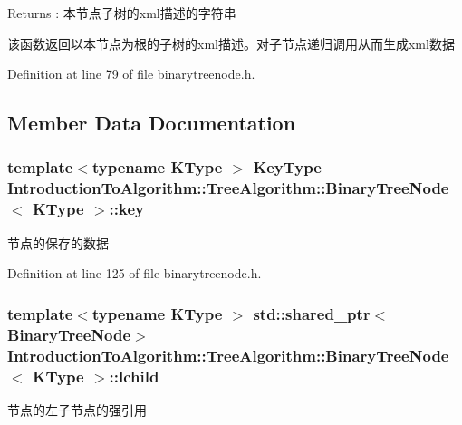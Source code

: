 \begin{DoxyReturn}{Returns}
\+: 本节点子树的{\ttfamily xml}描述的字符串
\end{DoxyReturn}
该函数返回以本节点为根的子树的{\ttfamily xml}描述。对子节点递归调用从而生成{\ttfamily xml}数据 

Definition at line 79 of file binarytreenode.\+h.



\subsection{Member Data Documentation}
\hypertarget{struct_introduction_to_algorithm_1_1_tree_algorithm_1_1_binary_tree_node_af3cb8030ab05ccaf1a69a86c9f468b8d}{}
\subsubsection[{key}]{\setlength{\rightskip}{0pt plus 5cm}template$<$typename K\+Type $>$ {\bf Key\+Type} {\bf Introduction\+To\+Algorithm\+::\+Tree\+Algorithm\+::\+Binary\+Tree\+Node}$<$ K\+Type $>$\+::key}\label{struct_introduction_to_algorithm_1_1_tree_algorithm_1_1_binary_tree_node_af3cb8030ab05ccaf1a69a86c9f468b8d}
节点的保存的数据 

Definition at line 125 of file binarytreenode.\+h.

\hypertarget{struct_introduction_to_algorithm_1_1_tree_algorithm_1_1_binary_tree_node_a3e056b1d34820497ac3a23a16180be2b}{}
\subsubsection[{lchild}]{\setlength{\rightskip}{0pt plus 5cm}template$<$typename K\+Type $>$ std\+::shared\+\_\+ptr$<${\bf Binary\+Tree\+Node}$>$ {\bf Introduction\+To\+Algorithm\+::\+Tree\+Algorithm\+::\+Binary\+Tree\+Node}$<$ K\+Type $>$\+::lchild}\label{struct_introduction_to_algorithm_1_1_tree_algorithm_1_1_binary_tree_node_a3e056b1d34820497ac3a23a16180be2b}
节点的左子节点的强引用 

